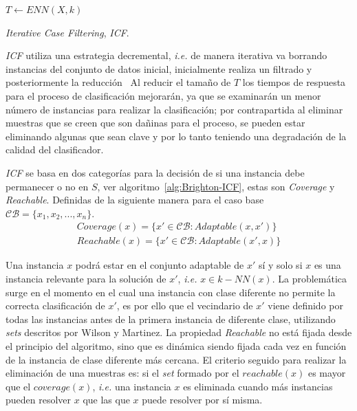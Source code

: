 \begin{algorithm}[H]
  	\BlankLine
  $T \leftarrow ENN(X,k)$\\  	
	\caption{\textit{Iterative Case Filtering}, \textit{ICF}.}\label{alg:Brighton-ICF}
\end{algorithm}

\textit{ICF} utiliza una estrategia decremental, \textit{i.e.} de manera iterativa va borrando instancias del conjunto de datos inicial, inicialmente realiza un filtrado y posteriormente la reducción~\cite{brighton2002advances} Al reducir el tamaño de $T$ los tiempos de respuesta para el proceso de clasificación mejorarán, ya que se examinarán un menor número de instancias para realizar la clasificación; por contrapartida al eliminar muestras que se creen que son dañinas para el proceso, se pueden estar eliminando algunas que sean clave y por lo tanto teniendo una degradación de la calidad del clasificador.

\textit{ICF} se basa en dos categorías para la decisión de si una instancia debe permanecer o no en $S$, ver algoritmo~\ref{alg:Brighton-ICF}, estas son \textit{Coverage} y \textit{Reachable}. Definidas de la siguiente manera para el caso base $\mathcal{CB} = \lbrace x_1, x_2, ..., x_n\rbrace$.
\begin{align*}
Coverage (x) = \lbrace x' \in \mathcal{CB} : Adaptable(x, x')\rbrace  \\
Reachable (x) = \lbrace x' \in \mathcal{CB} : Adaptable(x',x)\rbrace
\end{align*}

Una instancia $x$ podrá estar en el conjunto adaptable de $x'$ sí y solo si $x$ es una instancia relevante para la solución de $x'$, \textit{i.e.} $x \in k-NN(x)$. La problemática surge en el momento en el cual una instancia con clase diferente no permite la correcta clasificación de $x'$, es por ello que el vecindario de $x'$ viene definido por todas las instancias antes de la primera instancia de diferente clase, utilizando \textit{sets} descritos por Wilson y Martinez. La propiedad \textit{Reachable} no está fijada desde el principio del algoritmo, sino que es dinámica siendo fijada cada vez en función de la instancia de clase diferente más cercana. El criterio seguido para realizar la eliminación de una muestras es: si el \textit{set} formado por el $reachable(x)$ es mayor que el $coverage(x)$, \textit{i.e.} una instancia $x$ es eliminada cuando más instancias pueden resolver $x$ que las que $x$ puede resolver por sí misma.

